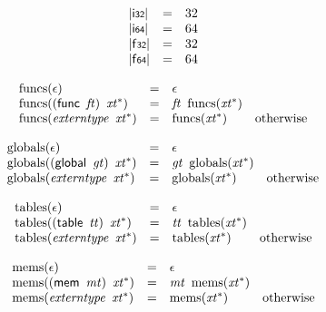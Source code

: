 $$
\begin{array}{@{}lcl@{}l@{}}
{|\mathsf{i{\scriptstyle32}}|} &=& 32 &  \\
{|\mathsf{i{\scriptstyle64}}|} &=& 64 &  \\
{|\mathsf{f{\scriptstyle32}}|} &=& 32 &  \\
{|\mathsf{f{\scriptstyle64}}|} &=& 64 &  \\
\end{array}
$$

\vspace{1ex}

$$
\begin{array}{@{}lcl@{}l@{}}
{\mathrm{funcs}}(\epsilon) &=& \epsilon &  \\
{\mathrm{funcs}}((\mathsf{func}~\,{\mathit{ft}})~\,{{\mathit{xt}}^\ast}) &=& {\mathit{ft}}~\,{\mathrm{funcs}}({{\mathit{xt}}^\ast}) &  \\
{\mathrm{funcs}}({\mathit{externtype}}~\,{{\mathit{xt}}^\ast}) &=& {\mathrm{funcs}}({{\mathit{xt}}^\ast}) &\quad
  \mbox{otherwise} \\
\end{array}
$$

$$
\begin{array}{@{}lcl@{}l@{}}
{\mathrm{globals}}(\epsilon) &=& \epsilon &  \\
{\mathrm{globals}}((\mathsf{global}~\,{\mathit{gt}})~\,{{\mathit{xt}}^\ast}) &=& {\mathit{gt}}~\,{\mathrm{globals}}({{\mathit{xt}}^\ast}) &  \\
{\mathrm{globals}}({\mathit{externtype}}~\,{{\mathit{xt}}^\ast}) &=& {\mathrm{globals}}({{\mathit{xt}}^\ast}) &\quad
  \mbox{otherwise} \\
\end{array}
$$

$$
\begin{array}{@{}lcl@{}l@{}}
{\mathrm{tables}}(\epsilon) &=& \epsilon &  \\
{\mathrm{tables}}((\mathsf{table}~\,{\mathit{tt}})~\,{{\mathit{xt}}^\ast}) &=& {\mathit{tt}}~\,{\mathrm{tables}}({{\mathit{xt}}^\ast}) &  \\
{\mathrm{tables}}({\mathit{externtype}}~\,{{\mathit{xt}}^\ast}) &=& {\mathrm{tables}}({{\mathit{xt}}^\ast}) &\quad
  \mbox{otherwise} \\
\end{array}
$$

$$
\begin{array}{@{}lcl@{}l@{}}
{\mathrm{mems}}(\epsilon) &=& \epsilon &  \\
{\mathrm{mems}}((\mathsf{mem}~\,{\mathit{mt}})~\,{{\mathit{xt}}^\ast}) &=& {\mathit{mt}}~\,{\mathrm{mems}}({{\mathit{xt}}^\ast}) &  \\
{\mathrm{mems}}({\mathit{externtype}}~\,{{\mathit{xt}}^\ast}) &=& {\mathrm{mems}}({{\mathit{xt}}^\ast}) &\quad
  \mbox{otherwise} \\
\end{array}
$$

